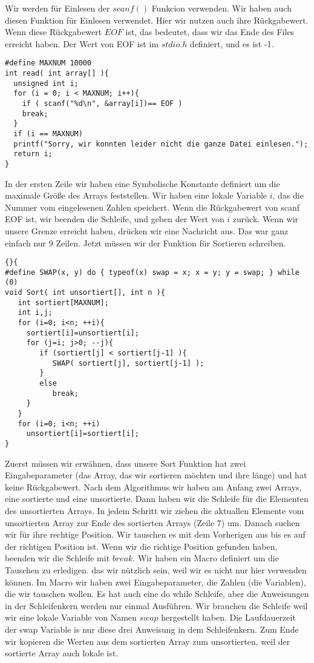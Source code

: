 \documentclass{article}[12pt]
\newenvironment{myexampleprogram}[1]{%
    \tcolorbox[beamer,%
    noparskip,breakable,
    colback=White,colframe=Goldenrod,%
    colbacklower=Yellow!75!White,%
    title=#1]}%
    {\endtcolorbox}
\begin{document}
\begin{myexampleprogram}{ Programme: \texttt{Einfügesortieren}}
Wir werden für Einlesen der $scanf()$ Funkcion verwenden. Wir haben auch diesen Funktion für 
Einlesen verwendet. Hier wir nutzen auch ihre Rückgabewert. Wenn diese Rückgabewert $EOF$ ist, 
das bedeutet, dass wir das Ende des Files erreicht haben. Der Wert von EOF ist im $stdio.h$ definiert, 
und es ist -1.
\begin{lstlisting}
#define MAXNUM 10000
int read( int array[] ){
  unsigned int i;
  for (i = 0; i < MAXNUM; i++){
    if ( scanf("%d\n", &array[i])== EOF )
    break;
  }
  if (i == MAXNUM)
  printf("Sorry, wir konnten leider nicht die ganze Datei einlesen.");
  return i;
}
\end{lstlisting} 
In der ersten Zeile wir haben eine Symbolische Konstante definiert um die maximale Größe des
Arrays feststellen. Wir haben eine lokale Variable $i$, das die Nummer vom eingelesenen Zahlen speichert.
Wenn die Rückgabewert von scanf EOF ist, wir beenden die Schleife, und geben der Wert von $i$ zurück.
Wenn wir unsere Grenze erreicht haben, drücken wir eine Nachricht aus.
Das war ganz einfach nur 9 Zeilen. Jetzt müssen wir der Funktion für Sortieren schreiben.
\begin{lstlisting}{}{
#define SWAP(x, y) do { typeof(x) swap = x; x = y; y = swap; } while (0)
void Sort( int unsortiert[], int n ){
   int sortiert[MAXNUM];
   int i,j;
   for (i=0; i<n; ++i){
     sortiert[i]=unsortiert[i];
     for (j=i; j>0; --j){
        if (sortiert[j] < sortiert[j-1] ){
           SWAP( sortiert[j], sortiert[j-1] );
        }
        else
           break;
     }
   }
   for (i=0; i<n; ++i)
     unsortiert[i]=sortiert[i];
}
\end{lstlisting}
Zuerst müssen wir erwähnen, dass unsere Sort Funktion hat zwei Eingabeparameter (das Array, das
wir sortieren möchten und ihre länge) und hat keine Rückgabewert. Nach dem Algorithmus 
wir haben am Anfang zwei Arrays, eine sortierte und eine unsortierte. Dann haben wir die Schleife für die 
Elementen des unsortierten Arrays. In jedem Schritt wir ziehen die aktuallen Elemente vom unsortierten Array
zur Ende des sortierten Arrays (Zeile 7) um. Danach suchen wir für ihre rechtige  Position.
Wir tauschen es mit dem Vorherigen aus bis es auf der richtigen Position ist. Wenn wir die richtige 
Position gefunden haben, beenden wir die Schleife mit $break$.
Wir haben ein Macro definiert um die Tauschen zu erledigen. das wir nützlich sein, weil wir es nicht nur
hier verwenden können. Im Macro wir haben zwei Eingabeparameter, die Zahlen (die Variablen), die wir tauschen 
wollen. Es hat auch eine do while Schleife, aber die Anweisungen in der Schleifenkern werden nur einmal Ausführen. 
Wir brauchen die Schleife weil wir eine lokale Variable von Namen $swap$ hergestellt haben. Die
Laufdauerzeit der swap Variable is nur diese drei Anweisung in dem Schleifenkern. Zum Ende 
wir kopieren die Werten aus dem sortierten Array zum unsortierten, weil der sortierte Array auch lokale ist.


\end{myexampleprogram}
\end{document}
